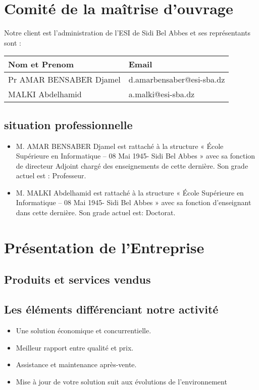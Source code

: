 \documentclass[11pt,fleqn]{book} %
\begin{document}
\section{Comité de la maîtrise d’ouvrage}
Notre client est l’administration de l’ESI de Sidi Bel Abbes et ses représentants sont :
\begin{center}
\begin{tabularx}{0.8\textwidth} { | p{5cm} | >{\raggedright\arraybackslash}X |  }
   \hline
 Nom et Prenom & Email  \\
 \hline
 Pr AMAR BENSABER Djamel  &  d.amarbensaber@esi-sba.dz  \\
  \hline
 MALKI Abdelhamid  & a.malki@esi-sba.dz   \\
  \hline
  \end{tabularx}
    \label{tbl:nicetablelesstable}
\end{center}
\subsection{situation professionnelle}
\begin{itemize}
    \item  M. AMAR BENSABER Djamel est rattaché à la structure « École Supérieure en Informatique – 08 Mai 1945- Sidi Bel Abbes » avec sa fonction de directeur Adjoint chargé des enseignements de cette dernière. Son grade actuel est : Professeur. 
    \item M. MALKI Abdelhamid est rattaché à la structure « École Supérieure en Informatique – 08 Mai 1945- Sidi Bel Abbes » avec sa fonction d’enseignant dans cette dernière. Son grade actuel est: Doctorat. 
\end{itemize}

\section{Présentation de l’Entreprise}
\subsection{Produits et services vendus}
\subsection{ Les éléments différenciant notre activité}
\begin{itemize}
    \item Une solution économique et concurrentielle.
     \item Meilleur rapport entre qualité et prix.
     \item Assistance et maintenance après-vente. 
     \item Mise à jour de votre solution suit aux évolutions de l’environnement
\end{itemize}
\end{document}
